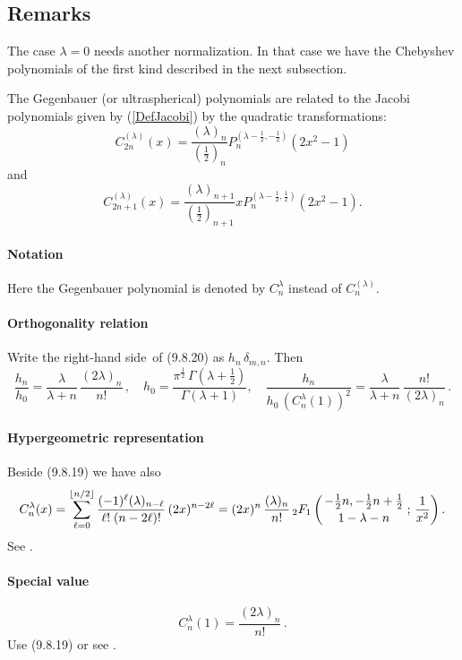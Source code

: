 \documentclass[envcountchap,graybox]{svmono}
\newcommand{\hyp}[5]{\mbox{}_{#1}{F}_{#2}
\left(\genfrac{}{}{0pt}{}{#3}{#4}\,;\,#5\right)}
\renewcommand{\Gamma}{\varGamma}
\newcommand\de\delta
\newcommand\la\lambda
\newcommand\Ga{\Gamma}
\newcommand\half{\frac12}
\newcommand\thalf{\tfrac12}
\newcommand\RHS{right-hand side}
\begin{document}
\subsection*{Remarks}
The case $\lambda=0$ needs another normalization. In that case we have the
Chebyshev polynomials of the first kind described in the next subsection.

\noindent
The Gegenbauer (or ultraspherical) polynomials are related to the Jacobi polynomials
given by (\ref{DefJacobi}) by the quadratic transformations:
$$C_{2n}^{(\lambda)}(x)=\frac{(\lambda)_n}{(\frac{1}{2})_n}
P_n^{(\lambda-\frac{1}{2},-\frac{1}{2})}(2x^2-1)$$
and
$$C_{2n+1}^{(\lambda)}(x)=\frac{(\lambda)_{n+1}}{(\frac{1}{2})_{n+1}}
xP_n^{(\lambda-\frac{1}{2},\frac{1}{2})}(2x^2-1).$$
\label{sec9.8.1}
%
\paragraph{Notation}
Here the Gegenbauer polynomial is denoted by $C_n^\la$ instead of $C_n^{(\la)}$.
%
\paragraph{Orthogonality relation}
Write the \RHS\ of (9.8.20) as $h_n\,\de_{m,n}$. Then
\begin{equation}
\frac{h_n}{h_0}=
\frac\la{\la+n}\,\frac{(2\la)_n}{n!}\,,\quad
h_0=\frac{\pi^\half\,\Ga(\la+\thalf)}{\Ga(\la+1)},\quad
\frac{h_n}{h_0\,(C_n^\la(1))^2}=
\frac\la{\la+n}\,\frac{n!}{(2\la)_n}\,.
\label{61}
\end{equation}
%
\paragraph{Hypergeometric representation}
Beside (9.8.19) we have also
\begin{equation}
C_n^\lambda(x)=\sum_{\ell=0}^{\lfloor n/2\rfloor}\frac{(-1)^{\ell}(\lambda)_{n-\ell}}
{\ell!\;(n-2\ell)!}\,(2x)^{n-2\ell}
=(2x)^{n}\,\frac{(\lambda)_{n}}{n!}\,
\hyp21{-\thalf n,-\thalf n+\thalf}{1-\la-n}{\frac1{x^2}}.
\label{57}
\end{equation}
See .
%
\paragraph{Special value}
\begin{equation}
C_n^{\la}(1)=\frac{(2\la)_n}{n!}\,.
\label{49}
\end{equation}
Use (9.8.19) or see .
%
\end{document}
